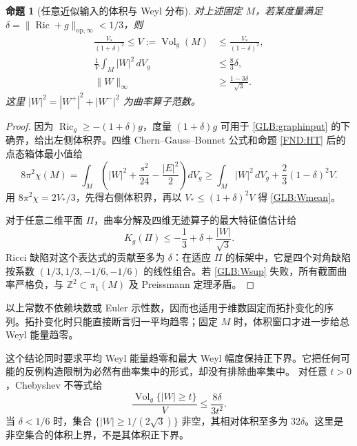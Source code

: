 \documentclass[UTF8,fontset=fandol,zihao=-4,oneside,openany]{ctexbook}
\theoremstyle{cjkplain}
\newtheorem{proposition}[theorem]{命题}
\numberwithin{equation}{chapter}
\DeclareMathOperator{\Ric}{Ric}
\DeclareMathOperator{\Vol}{Vol}
\begin{document}
\begin{proposition}[任意近似输入的体积与 Weyl 分布]\label{GLB:graphpinch}
对上述固定 $M$，若某度量满足 $\delta=\|\Ric+g\|_{\mathrm{op},\infty}<1/3$，则
\begin{align}
\frac{V_*}{(1+\delta)^2}\le V:=\Vol_g(M)
&\le\frac{V_*}{(1-\delta)^2},\label{GLB:volwindow}\\
\frac1V\int_M|W|^2\,dV_g&\le\frac83\delta,\label{GLB:Wmean}\\
\|W\|_\infty&\ge\frac{1-3\delta}{\sqrt3}.\label{GLB:Wsup}
\end{align}
这里 $|W|^2=|W^+|^2+|W^-|^2$ 为曲率算子范数。
\end{proposition}
\begin{proof}
因为 $\Ric_g\ge-(1+\delta)g$，度量 $(1+\delta)g$ 可用于 \eqref{GLB:graphinput} 的下确界，给出左侧体积界。四维 Chern--Gauss--Bonnet 公式和命题 \ref{FND:HT} 后的点态箱体最小值给
\[
8\pi^2\chi(M)=\int_M\left(|W|^2+\frac{s^2}{24}-\frac{|E|^2}{2}\right)dV_g
\ge\int_M|W|^2\,dV_g+\frac23(1-\delta)^2V.
\]
用 $8\pi^2\chi=2V_*/3$，先得右侧体积界，再以 $V_*\le(1+\delta)^2V$ 得 \eqref{GLB:Wmean}。

对于任意二维平面 $\Pi$，曲率分解及四维无迹算子的最大特征值估计给
\[
K_g(\Pi)\le-\frac13+\delta+\frac{|W|}{\sqrt3}.
\]
Ricci 缺陷对这个表达式的贡献至多为 $\delta$：在适应 $\Pi$ 的标架中，它是四个对角缺陷按系数 $(1/3,1/3,-1/6,-1/6)$ 的线性组合。若 \eqref{GLB:Wsup} 失败，所有截面曲率严格负，与 $\mathbb Z^2\subset\pi_1(M)$ 及 Preissmann 定理矛盾。
\end{proof}

以上常数不依赖块数或 Euler 示性数，因而也适用于维数固定而拓扑变化的序列。拓扑变化时只能直接断言归一平均趋零；固定 $M$ 时，体积窗口才进一步给总 Weyl 能量趋零。

这个结论同时要求平均 Weyl 能量趋零和最大 Weyl 幅度保持正下界。它把任何可能的反例构造限制为必然有曲率集中的形式，却没有排除曲率集中。
对任意 $t>0$，Chebyshev 不等式给
\[
\frac{\Vol_g\{|W|\ge t\}}V\le\frac{8\delta}{3t^2}.
\]
当 $\delta<1/6$ 时，集合 $\{|W|\ge1/(2\sqrt3)\}$ 非空，其相对体积至多为 $32\delta$。这里是非空集合的体积上界，不是其体积正下界。
\end{document}

